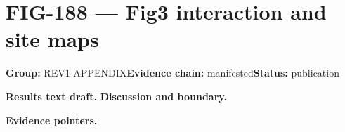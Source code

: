 \clearpage
\section{FIG-188 --- Fig3 interaction and site maps}
\label{figpage:fig-188}
\textbf{Group:} REV1-APPENDIX\quad \textbf{Evidence chain:} manifested\quad \textbf{Status:} publication

\textbf{Results text draft.} 
\textbf{Discussion and boundary.} 


\textbf{Evidence pointers.}



\vfill

